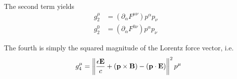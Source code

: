 \documentclass[10pt,letterpaper,extrafontsizes, onecolumn,openright]{memoir}
\begin{document}
The second term yields
  \begin{align*}
    g_2^\mu &= \left(\partial_\alpha F^{\mu\nu}\right)p^\alpha p_\nu & \\
    g_2^0   &= \left(\partial_\alpha F^{0\nu}\right)p^\alpha p_\nu   &
  \end{align*}

The fourth is simply the squared magnitude of the Lorentz force vector, i.e.
  \begin{equation}
    g_4^\mu = \left\lVert \frac{\epsilon\vb{E}}{c}+\left(\vb{p}\times\vb{B}\right)-(\vb{p}\cdot\vb{E})\right\rVert^2 p^\mu
  \end{equation}

\appendix



\end{document}
